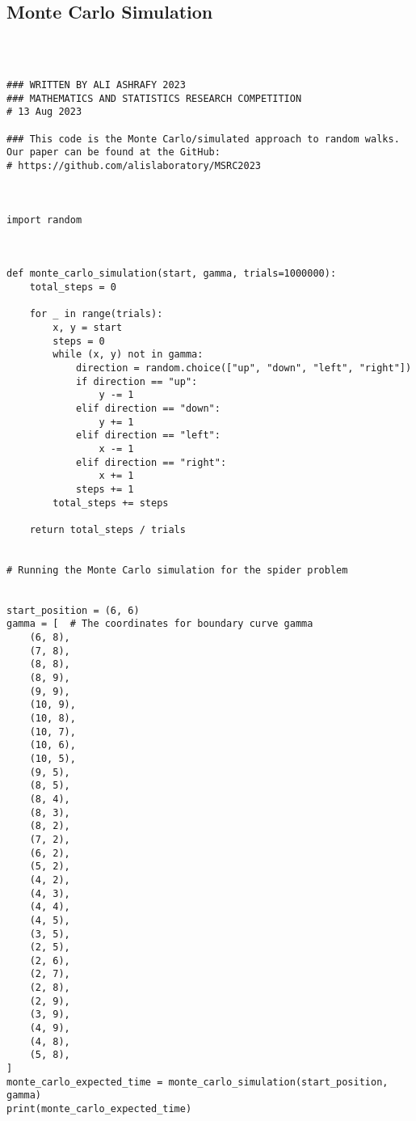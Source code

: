 \documentclass[12pt,a4paper]{article}
\begin{document}
\subsection{Monte Carlo Simulation}
\begin{lstlisting}



### WRITTEN BY ALI ASHRAFY 2023
### MATHEMATICS AND STATISTICS RESEARCH COMPETITION
# 13 Aug 2023

### This code is the Monte Carlo/simulated approach to random walks. Our paper can be found at the GitHub:
# https://github.com/alislaboratory/MSRC2023



import random



def monte_carlo_simulation(start, gamma, trials=1000000):
    total_steps = 0

    for _ in range(trials):
        x, y = start
        steps = 0
        while (x, y) not in gamma:
            direction = random.choice(["up", "down", "left", "right"])
            if direction == "up":
                y -= 1
            elif direction == "down":
                y += 1
            elif direction == "left":
                x -= 1
            elif direction == "right":
                x += 1
            steps += 1
        total_steps += steps

    return total_steps / trials


# Running the Monte Carlo simulation for the spider problem


start_position = (6, 6)
gamma = [  # The coordinates for boundary curve gamma
    (6, 8),
    (7, 8),
    (8, 8),
    (8, 9),
    (9, 9),
    (10, 9),
    (10, 8),
    (10, 7),
    (10, 6),
    (10, 5),
    (9, 5),
    (8, 5),
    (8, 4),
    (8, 3),
    (8, 2),
    (7, 2),
    (6, 2),
    (5, 2),
    (4, 2),
    (4, 3),
    (4, 4),
    (4, 5),
    (3, 5),
    (2, 5),
    (2, 6),
    (2, 7),
    (2, 8),
    (2, 9),
    (3, 9),
    (4, 9),
    (4, 8),
    (5, 8),
]
monte_carlo_expected_time = monte_carlo_simulation(start_position, gamma)
print(monte_carlo_expected_time)
\end{lstlisting}
\end{document}
